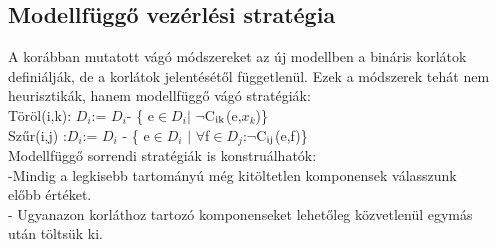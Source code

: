 \documentclass{article}
\begin{document}
	 \subsection{Modellfüggő vezérlési stratégia}
	 A korábban mutatott vágó módszereket az új modellben a bináris korlátok definiálják, de a korlátok jelentésétől függetlenül. Ezek a módszerek tehát nem heurisztikák, hanem modellfüggő vágó stratégiák:\\
	 \hspace*{1em} Töröl(i,k): $D_i$:= $D_i$- \{ e$\in$$D_i$$|$ $\neg$C$\textsubscript{ik}$(e,$x_k$)\}\\
	 \hspace*{1em} Szűr(i,j) :$D_i$:=  $D_i$ - \{ e$\in$$D_i$ $|$ $\forall$f$\in$$D_j$:$\neg$C$\textsubscript{ij}$(e,f)\}\\
	 Modellfüggő sorrendi stratégiák is konstruálhatók:\\
	 \hspace*{1em} -Mindig a legkisebb tartományú még kitöltetlen komponensek válasszunk\\
	 \hspace*{2em} előbb értéket.\\
	 \hspace*{1em}- Ugyanazon korláthoz tartozó komponenseket lehetőleg közvetlenül egymás\\
	 \hspace*{2em} után töltsük ki.\\
	 
	 
	 
	 
	
		
\end{document}
